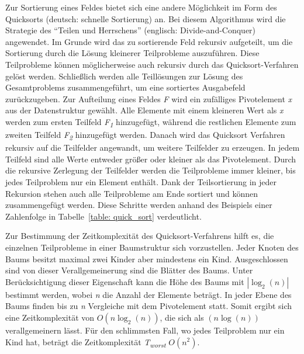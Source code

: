 Zur Sortierung eines Feldes bietet sich eine andere Möglichkeit im Form des Quicksorts (deutsch: schnelle Sortierung) an. Bei diesem Algorithmus wird die Strategie des \enquote{Teilen und Herrschens} (englisch: Divide-and-Conquer) angewendet. Im Grunde wird das zu sortierende Feld rekursiv aufgeteilt, um die Sortierung durch die Lösung kleinerer Teilprobleme auszuführen. Diese Teilprobleme können möglicherweise auch rekursiv durch das Quicksort-Verfahren gelöst werden. Schließlich werden alle Teillösungen zur Lösung des Gesamtproblems zusammengeführt, um eine sortiertes Ausgabefeld zurückzugeben. Zur Aufteilung eines Feldes \textit{F} wird ein zufälliges Pivotelement \textit{x} aus der Datenstruktur gewählt. Alle Elemente mit einem kleineren Wert als \textit{x} werden zum ersten Teilfeld \textit{F\textsubscript{1}} hinzugefügt, während die restlichen Elemente zum zweiten Teilfeld \textit{F\textsubscript{2}} hinzugefügt werden. Danach wird das Quicksort Verfahren rekursiv auf die Teilfelder angewandt, um weitere Teilfelder zu erzeugen. In jedem Teilfeld sind alle Werte entweder größer oder kleiner als das Pivotelement. Durch die rekursive Zerlegung der Teilfelder werden die Teilprobleme immer kleiner, bis jedes Teilproblem nur ein Element enthält. Dank der Teilsortierung in jeder Rekursion stehen auch alle Teilprobleme am Ende sortiert und können zusammengefügt werden. Diese Schritte werden anhand des Beispiels einer Zahlenfolge in Tabelle~\ref{table: quick_sort} verdeutlicht. \autocite[76-77]{knebl_algorithmen_2021}

Zur Bestimmung der Zeitkomplexität des Quicksort-Verfahrens hilft es, die einzelnen Teilprobleme in einer Baumstruktur sich vorzustellen. Jeder Knoten des Baums besitzt maximal zwei Kinder aber mindestens ein Kind. Ausgeschlossen sind von dieser Verallgemeinerung sind die Blätter des Baums. Unter Berücksichtigung dieser Eigenschaft kann die Höhe des Baums mit $|\log_{2}(n)|$ bestimmt werden, wobei \textit{n} die Anzahl der Elemente beträgt. In jeder Ebene des Baums finden bis zu \textit{n} Vergleiche mit dem Pivotelement statt. Somit ergibt sich eine Zeitkomplexität von $O(n\log_{2}(n))$, die sich als $(n\log(n))$ verallgemeinern lässt. Für den schlimmsten Fall, wo jedes Teilproblem nur ein Kind hat, beträgt die Zeitkomplexität \textit{T\textsubscript{worst}} $O(n^2)$. \autocite[216-217]{hubwieser_fundamente_2015} \autocite[79]{knebl_algorithmen_2021} \autocite[169-170]{sanders_sequential_2019}

